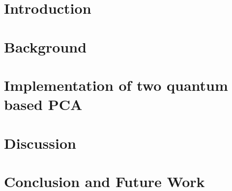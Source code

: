 \section{Introduction}



\section{Background}
\label{sec:background}



\section{Implementation of two quantum based PCA}
\label{sec:survey}



\section{Discussion}\label{sec:discussion}



\section{Conclusion and Future Work}\label{sec:conclusion}

